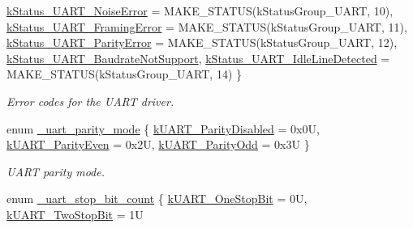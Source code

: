 \begin{DoxyCompactItemize}
\mbox{\hyperlink{group__uart__driver_ggacef40dc8e8ac174bfe40ebcbc980f84bae4ef4df9a5f756ccf1b4bf08292ec2fb}{k\+Status\+\_\+\+U\+A\+R\+T\+\_\+\+Noise\+Error}} = M\+A\+K\+E\+\_\+\+S\+T\+A\+T\+US(k\+Status\+Group\+\_\+\+U\+A\+RT, 10), 
\mbox{\hyperlink{group__uart__driver_ggacef40dc8e8ac174bfe40ebcbc980f84baa7aa134f85df3d5863ca962ce1ea7ee0}{k\+Status\+\_\+\+U\+A\+R\+T\+\_\+\+Framing\+Error}} = M\+A\+K\+E\+\_\+\+S\+T\+A\+T\+US(k\+Status\+Group\+\_\+\+U\+A\+RT, 11), 
\newline
\mbox{\hyperlink{group__uart__driver_ggacef40dc8e8ac174bfe40ebcbc980f84baea20b2588c38f259f1412aa7132c9ef8}{k\+Status\+\_\+\+U\+A\+R\+T\+\_\+\+Parity\+Error}} = M\+A\+K\+E\+\_\+\+S\+T\+A\+T\+US(k\+Status\+Group\+\_\+\+U\+A\+RT, 12), 
\mbox{\hyperlink{group__uart__driver_ggacef40dc8e8ac174bfe40ebcbc980f84bae6cdb41e1b49958f57727cd47afd69b2}{k\+Status\+\_\+\+U\+A\+R\+T\+\_\+\+Baudrate\+Not\+Support}}, 
\mbox{\hyperlink{group__uart__driver_ggacef40dc8e8ac174bfe40ebcbc980f84ba3e5b488f7ed418cb08399a5db193103e}{k\+Status\+\_\+\+U\+A\+R\+T\+\_\+\+Idle\+Line\+Detected}} = M\+A\+K\+E\+\_\+\+S\+T\+A\+T\+US(k\+Status\+Group\+\_\+\+U\+A\+RT, 14)
 \}
\begin{DoxyCompactList}\small\item\em Error codes for the U\+A\+RT driver. \end{DoxyCompactList}\item 
enum \mbox{\hyperlink{group__uart__driver_gadf9f66755acc340eab030e1a48e35e10}{\+\_\+uart\+\_\+parity\+\_\+mode}} \{ \mbox{\hyperlink{group__uart__driver_ggadf9f66755acc340eab030e1a48e35e10a97e2feae6671a6de1126ebc2edf4606b}{k\+U\+A\+R\+T\+\_\+\+Parity\+Disabled}} = 0x0U, 
\mbox{\hyperlink{group__uart__driver_ggadf9f66755acc340eab030e1a48e35e10a9e68fe3aba46e045bee5433ed098bff0}{k\+U\+A\+R\+T\+\_\+\+Parity\+Even}} = 0x2U, 
\mbox{\hyperlink{group__uart__driver_ggadf9f66755acc340eab030e1a48e35e10ae48c7fabc9babf1be626ebeb2627a54c}{k\+U\+A\+R\+T\+\_\+\+Parity\+Odd}} = 0x3U
 \}
\begin{DoxyCompactList}\small\item\em U\+A\+RT parity mode. \end{DoxyCompactList}\item 
enum \mbox{\hyperlink{group__uart__driver_ga3c656a4365cab1185398ff953272091e}{\+\_\+uart\+\_\+stop\+\_\+bit\+\_\+count}} \{ \mbox{\hyperlink{group__uart__driver_gga3c656a4365cab1185398ff953272091ea5a8829a108d8a46abb097a36cde051a7}{k\+U\+A\+R\+T\+\_\+\+One\+Stop\+Bit}} = 0U, 
\mbox{\hyperlink{group__uart__driver_gga3c656a4365cab1185398ff953272091ea9704b3ae3ee851acf324eb357f75ab56}{k\+U\+A\+R\+T\+\_\+\+Two\+Stop\+Bit}} = 1U

\end{DoxyCompactItemize}
